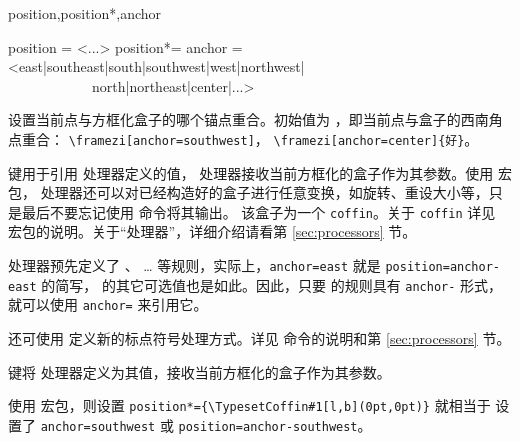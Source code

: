 \documentclass{ctxdoc}
\begin{document}
\begin{function}{position,position*,anchor}
  \begin{syntax}
    position = <...>
    position*= 
    anchor   = <east|southeast|south|southwest|west|northwest|
    ~~~~~~~~~~~~north|northeast|center|...> 
  \end{syntax}
   设置当前点与方框化盒子的哪个锚点重合。初始值为 ，即当前点与盒子的西南角点重合：
  \verb|\framezi[anchor=southwest]|，
  \verb|\framezi[anchor=center]{好}|。

   键用于引用  处理器定义的值， 处理器接收当前方框化的盒子作为其参数。使用  宏包，
   处理器还可以对已经构造好的盒子进行任意变换，如旋转、重设大小等，只是最后不要忘记使用  命令将其输出。
  该盒子为一个 \verb|coffin|。关于 \verb|coffin| 详见 \cite{pkg-xcoffins} 宏包的说明。关于“处理器”，详细介绍请看第 \ref{sec:processors} 节。
  
   处理器预先定义了 、 … 等规则，实际上，\verb|anchor=east| 就是 \verb|position=anchor-east| 的简写，
   的其它可选值也是如此。因此，只要  的规则具有 \verb|anchor-| 形式，就可以使用 \verb|anchor=|
  来引用它。

  还可使用  定义新的标点符号处理方式。详见  命令的说明和第 \ref{sec:processors} 节。
  
   键将  处理器定义为其值，接收当前方框化的盒子作为其参数。

  使用  宏包，则设置 \verb|position*={\TypesetCoffin#1[l,b](0pt,0pt)}| 就相当于
  设置了 \verb|anchor=southwest| 或 \verb|position=anchor-southwest|。
\end{function}
\end{document}
